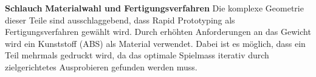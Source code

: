 \textbf{Schlauch}
\newline
\textbf{Materialwahl und Fertigungsverfahren}
\newline
Die komplexe Geometrie dieser Teile sind ausschlaggebend, dass Rapid Prototyping als Fertigungsverfahren gewählt wird. Durch erhöhten Anforderungen an das Gewicht wird ein Kunststoff (ABS) als Material verwendet. Dabei ist es möglich, dass ein Teil mehrmals gedruckt wird, da das optimale Spielmass iterativ durch zielgerichtetes Ausprobieren gefunden werden muss. 